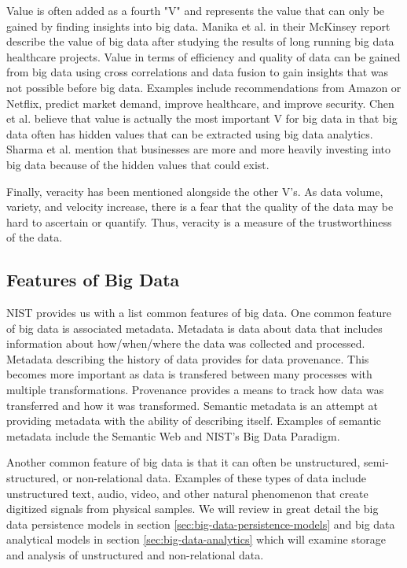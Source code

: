 \documentclass[]{article}
\begin{document}
Value is often added as a fourth "V" and represents the value that can only be gained by finding insights into big data. Manika et al. in their McKinsey report\cite{manyika2011big} describe the value of big data after studying the results of long running big data healthcare projects. Value in terms of efficiency and quality of data can be gained from big data using cross correlations and data fusion to gain insights that was not possible before big data. Examples include recommendations from Amazon or Netflix, predict market demand, improve healthcare, and improve security\cite{marr_2015}. Chen et al.\cite{chen_big_2014} believe that value is actually the most important V for big data in that big data often has hidden values that can be extracted using big data analytics. Sharma et al.\cite{sharma_extended_2015} mention that businesses are more and more heavily investing into big data because of the hidden values that could exist.

Finally, veracity has been mentioned alongside the other V's\cite{sharma_extended_2015}. As data volume, variety, and velocity increase, there is a fear that the quality of the data may be hard to ascertain or quantify. Thus, veracity is a measure of the trustworthiness of the data.

\subsection{Features of Big Data}
NIST\cite{nist_big_data_2015} provides us with a list common features of big data. One common feature of big data is associated metadata. Metadata is data about data that includes information about how/when/where the data was collected and processed. Metadata describing the history of data provides for data provenance. This becomes more important as data is transfered between many processes with multiple transformations. Provenance provides a means to track how data was transferred and how it was transformed. Semantic metadata is an attempt at providing metadata with the ability of describing itself. Examples of semantic metadata include the Semantic Web\cite{berners-lee_semantic_2001} and NIST's Big Data Paradigm. 

Another common feature of big data is that it can often be unstructured, semi-structured, or non-relational data. Examples of these types of data include unstructured text, audio, video, and other natural phenomenon that create digitized signals from physical samples. We will review in great detail the big data persistence models in section \ref{sec:big-data-persistence-models} and big data analytical models in section \ref{sec:big-data-analytics} which will examine storage and analysis of unstructured and non-relational data. 
\end{document}
